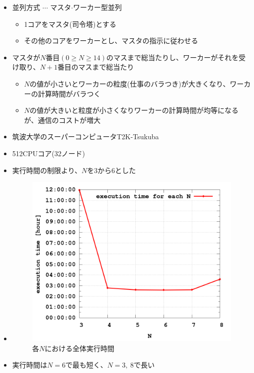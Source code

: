 \documentclass[a4paper,landscape,25pt]{foils}
\begin{document}
\begin{itemize}
\item 並列方式 $\cdots$ マスタ$\cdot$ワーカー型並列
\begin{itemize}
\item 1コアをマスタ(司令塔)とする
\item その他のコアをワーカーとし、マスタの指示に従わせる
\end{itemize}
\end{itemize}

\begin{itemize}
\item マスタが$N$番目$(0 \ge N \ge 14)$のマスまで総当たりし、ワーカーがそれを受け取り、$N+1$番目のマスまで総当たり
\begin{itemize}
\item $N$の値が小さいとワーカーの粒度(仕事のバラつき)が大きくなり、ワーカーの計算時間がバラつく
\item $N$の値が大きいと粒度が小さくなりワーカーの計算時間が均等になるが、通信のコストが増大
\end{itemize}
\end{itemize}

\begin{itemize}
\item 筑波大学のスーパーコンピュータT2K-Tsukuba
\item 512CPUコア(32ノード)
\end{itemize}

\begin{itemize}
\item 実行時間の制限より、$N$を3から6とした
\item 
\begin{figure}[htb]
\centering
\includegraphics[height=0.5\textheight]{image3}
\caption{各$N$における全体実行時間}
\end{figure}
\item 実行時間は$N=6$で最も短く、$N=3, \ 8$で長い
\end{itemize}
\end{document}
